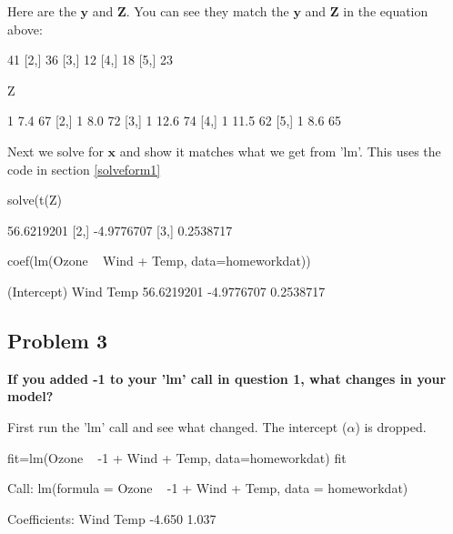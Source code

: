 Here are the $\mathbf{y}$ and $\mathbf{Z}$. You can see they match the $\mathbf{y}$ and $\mathbf{Z}$ in the equation above:
\begin{Schunk}
\begin{Soutput}
     [,1]
[1,]   41
[2,]   36
[3,]   12
[4,]   18
[5,]   23
\end{Soutput}
\begin{Sinput}
 Z
\end{Sinput}
\begin{Soutput}
     [,1] [,2] [,3]
[1,]    1  7.4   67
[2,]    1  8.0   72
[3,]    1 12.6   74
[4,]    1 11.5   62
[5,]    1  8.6   65
\end{Soutput}
\end{Schunk}
Next we solve for $$ and show it matches what we get from 'lm'. This uses the code in section \ref{solveform1}
\begin{Schunk}
\begin{Sinput}
 solve(t(Z)%*%Z)%*%t(Z)%*%y
\end{Sinput}
\begin{Soutput}
           [,1]
[1,] 56.6219201
[2,] -4.9776707
[3,]  0.2538717
\end{Soutput}
\begin{Sinput}
 coef(lm(Ozone ~ Wind + Temp, data=homeworkdat))
\end{Sinput}
\begin{Soutput}
(Intercept)        Wind        Temp 
 56.6219201  -4.9776707   0.2538717 
\end{Soutput}
\end{Schunk}

\subsection*{Problem 3}
{\bf If you added -1 to your 'lm' call in question 1, what changes in your model?}

First run the 'lm' call and see what changed.  The intercept ($\alpha$) is dropped.
\begin{Schunk}
\begin{Sinput}
 fit=lm(Ozone ~ -1 + Wind + Temp, data=homeworkdat)
 fit
\end{Sinput}
\begin{Soutput}
Call:
lm(formula = Ozone ~ -1 + Wind + Temp, data = homeworkdat)

Coefficients:
  Wind    Temp  
-4.650   1.037  
\end{Soutput}
\end{Schunk}

